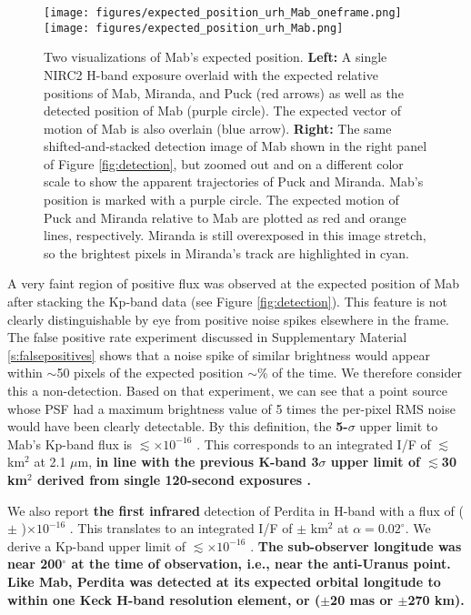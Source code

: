 \documentclass[preprint]{aastex631}
\begin{document}
\begin{figure}
\texttt{[image: figures/expected\_position\_urh\_Mab\_oneframe.png]}
\texttt{[image: figures/expected\_position\_urh\_Mab.png]}
\caption{Two visualizations of Mab's expected position. \textbf{Left:} A single NIRC2 H-band exposure overlaid with the expected relative positions of Mab, Miranda, and Puck (red arrows) as well as the detected position of Mab (purple circle). The expected vector of motion of Mab is also overlain (blue arrow). \textbf{Right:} The same shifted-and-stacked detection image of Mab shown in the right panel of Figure \ref{fig:detection}, but zoomed out and on a different color scale to show the apparent trajectories of Puck and Miranda. Mab's position is marked with a purple circle. The expected motion of Puck and Miranda relative to Mab are plotted as red and orange lines, respectively. Miranda is still overexposed in this image stretch, so the brightest pixels in Miranda's track are highlighted in cyan.}
\label{fig:astrometry}
\end{figure}

A very faint region of positive flux was observed at the expected position of Mab after stacking the Kp-band data (see Figure \ref{fig:detection}). This feature is not clearly distinguishable by eye from positive noise spikes elsewhere in the frame. The false positive rate experiment discussed in Supplementary Material \ref{s:falsepositives} shows that a noise spike of similar brightness would appear within $\sim$50 pixels of the expected position $\sim$\% of the time. We therefore consider this a non-detection. Based on that experiment, we can see that a point source whose PSF had a maximum brightness value of 5 times the per-pixel RMS noise would have been clearly detectable. By this definition, the \textbf{5-$\sigma$} upper limit to Mab's Kp-band flux is
$\lesssim$$\times10^{-16}$ \ergsec{}. 
This corresponds to an integrated I/F of 
$\lesssim$ km$^{2}$ 
at 2.1 $\mu$m, \textbf{in line with the previous K-band 3$\sigma$ upper limit of $\lesssim$30 km$^2$ derived from single 120-second exposures \citep{depater06}.}

We also report \textbf{the first infrared} detection of Perdita in H-band with a flux of
( $\pm$ )$\times10^{-16}$ \ergsec{}.
This translates to an integrated I/F of  $\pm$  km$^2$ at $\alpha=0.02^\circ$. We derive a Kp-band upper limit of $\lesssim$$\times10^{-16}$ \ergsec{}. \textbf{The sub-observer longitude was near 200$^\circ$ at the time of observation, i.e., near the anti-Uranus point.}
\textbf{Like Mab, Perdita was detected at its expected orbital longitude to within one Keck H-band resolution element, or ($\pm$20 mas or $\pm$270 km).}
\end{document}
